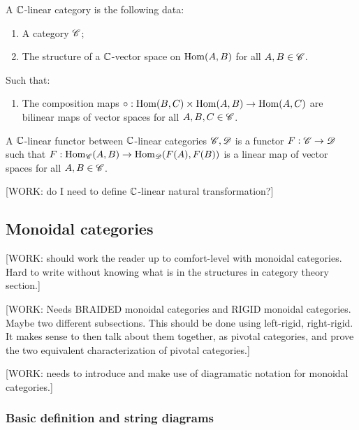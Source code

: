 \begin{definition} A $\mathbb{C}$-linear category is the following data:

\begin{enumerate}
\item A category $\mathscr{C}$;
\item The structure of a $\mathbb{C}$-vector space on $\operatorname{Hom}(A,B)$ for all $A,B\in \mathscr{C}$.

\end{enumerate}

Such that:

\begin{enumerate}

\item The composition maps $\circ:\operatorname{Hom}(B,C)\times \operatorname{Hom}(A,B)\to \operatorname{Hom}(A,C)$ are bilinear maps of vector spaces for all $A,B,C\in \mathscr{C}$.
\end{enumerate}

\raggedleft\qedsymbol{}
\end{definition}



\begin{definition} A $\mathbb{C}$-linear functor between $\mathbb{C}$-linear categories $\mathscr{C},\mathscr{D}$ is a functor $F:\mathscr{C}\to\mathscr{D}$ such that $F:\operatorname{Hom}_{\mathscr{C}}(A,B)\to\operatorname{Hom}_{\mathscr{D}}(F(A),F(B))$ is a linear map of vector spaces for all $A,B\in\mathscr{C}$.

\raggedleft\qedsymbol{}
\end{definition}


[WORK: do I need to define $\mathbb{C}$-linear natural transformation?]

\subsection{Monoidal categories}

[WORK: should work the reader up to comfort-level with monoidal categories. Hard to write without knowing what is in the structures in category theory section.]

[WORK: Needs BRAIDED monoidal categories and RIGID monoidal categories. Maybe two different subsections. This should be done using left-rigid, right-rigid. It makes sense to then talk about them together, as pivotal categories, and prove the two equivalent characterization of pivotal categories.]

[WORK: needs to introduce and make use of diagramatic notation for monoidal categories.]

\subsubsection{Basic definition and string diagrams}


